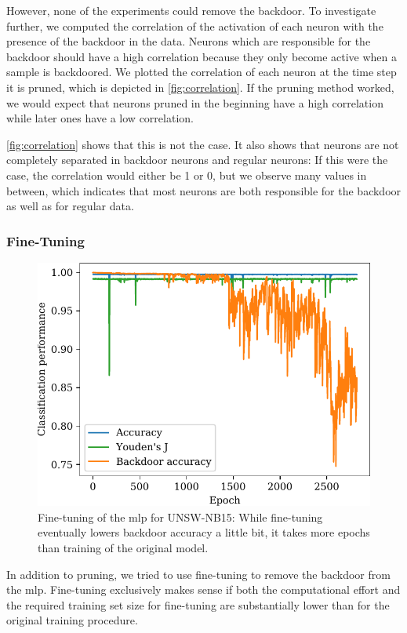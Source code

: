 \documentclass[9pt,sigconf,letterpaper,dvipsnames\ifx\removeHeaders\tempYes ,nonacm\fi]{acmart}
\newcommand\note[2]{{\color{#1}#2}}
\newcommand\todo[1]{{\note{red}{TODO: #1}}}
\newcommand{\unsw}{UNSW-NB15}
\begin{document}
However, none of the experiments could remove the backdoor.
To investigate further, we computed the correlation of the activation of each neuron with the presence of the backdoor in the data. Neurons which are responsible for the backdoor should have a high correlation because they only become active when a sample is backdoored. We  plotted the correlation of each neuron at the time step it is pruned, which is depicted in \autoref{fig:correlation}. If the pruning method worked, we would expect
that neurons pruned in the beginning have a high correlation while later ones have a low correlation.

\autoref{fig:correlation} shows that this is not the case. It also shows that neurons are not completely separated in backdoor neurons and regular neurons: If this were the case, the correlation would either be 1 or 0, but we observe many values in between, which indicates that most neurons are both responsible for the backdoor as well as for regular data.

\subsubsection{Fine-Tuning}
\begin{figure}[b]
\includegraphics[width=\columnwidth]{figures/finetuning_2017.pdf}
\caption{Fine-tuning of the \gls{mlp} for \unsw{}: While fine-tuning eventually lowers backdoor accuracy a little bit, it takes more epochs than training of the original model.}
\label{fig:finetuning}
\end{figure}
In addition to pruning, we tried to use fine-tuning to remove the backdoor from the \gls{mlp}. %
Fine-tuning exclusively makes  sense if both the computational effort and the required training set size for fine-tuning are substantially lower than for the original training procedure.
\end{document}
